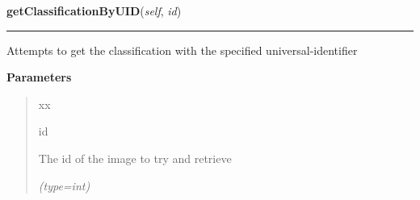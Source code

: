 \hspace{.8\funcindent}\begin{boxedminipage}{\funcwidth}

    \raggedright \textbf{getClassificationByUID}(\textit{self}, \textit{id})

    \vspace{-1.5ex}

    \rule{\textwidth}{0.5\fboxrule}
\setlength{\parskip}{2ex}
    Attempts to get the classification with the specified 
    universal-identifier

\setlength{\parskip}{1ex}
      \textbf{Parameters}
      \vspace{-1ex}

      \begin{quote}
        \begin{Ventry}{xx}

          \item[id]

          The id of the image to try and retrieve

            {\it (type=int)}

        \end{Ventry}

      \end{quote}

    \end{boxedminipage}

    \label{src:dao:classification_dao:ClassificationDAO:getClassification}

    \vspace{0.5ex}


